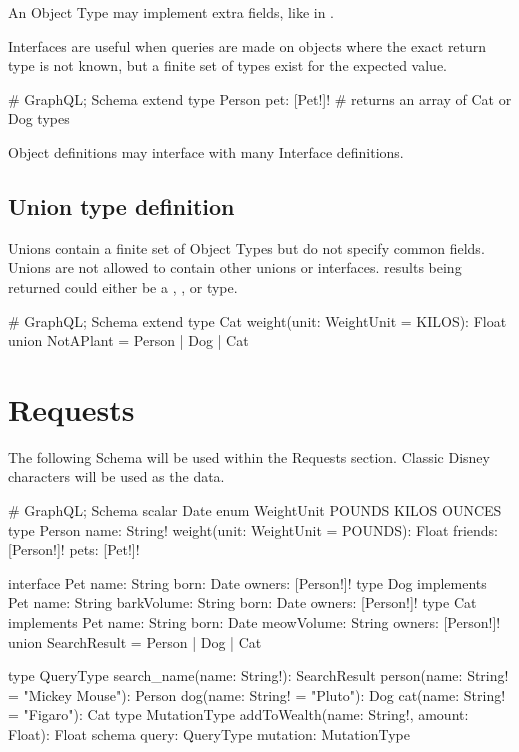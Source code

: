 \documentclass[stat,dissertation]{puthesis}\usepackage[]{graphicx}\usepackage{xcolor}
\begin{document}
An Object Type may implement extra fields, like  in .

Interfaces are useful when queries are made on objects where the exact return type is not known, but a finite set of types exist for the expected value.

\begin{graphqlcode}
# GraphQL; Schema
extend type Person {
  pet: [Pet!]! # returns an array of Cat or Dog types
}
\end{graphqlcode}

Object definitions may interface with many Interface definitions.

\subsection{Union type definition}

Unions contain a finite set of Object Types but do not specify common fields.  Unions are not allowed to contain other unions or interfaces.   results being returned could either be a , , or  type.

\begin{graphqlcode}
# GraphQL; Schema
extend type Cat {
  weight(unit: WeightUnit = KILOS): Float
}
union NotAPlant = Person | Dog | Cat
\end{graphqlcode}


\section{Requests}

The following Schema will be used within the Requests section.  Classic Disney characters will be used as the data.

\begin{graphqlcode}
# GraphQL; Schema
scalar Date
enum WeightUnit {
  POUNDS
  KILOS
  OUNCES
}
type Person {
  name: String!
  weight(unit: WeightUnit = POUNDS): Float
  friends: [Person!]!
  pets: [Pet!]!
}
\end{graphqlcode}
\begin{graphqlcode}
interface Pet {
  name: String
  born: Date
  owners: [Person!]!
}
type Dog implements Pet {
  name: String
  barkVolume: String
  born: Date
  owners: [Person!]!
}
type Cat implements Pet {
  name: String
  born: Date
  meowVolume: String
  owners: [Person!]!
}
union SearchResult = Person | Dog | Cat
\end{graphqlcode}
\begin{graphqlcode}
type QueryType {
  search_name(name: String!): SearchResult
  person(name: String! = "Mickey Mouse"): Person
  dog(name: String! = "Pluto"): Dog
  cat(name: String! = "Figaro"): Cat
}
type MutationType {
  addToWealth(name: String!, amount: Float): Float
}
schema {
  query: QueryType
  mutation: MutationType
}
\end{graphqlcode}
\end{document}
